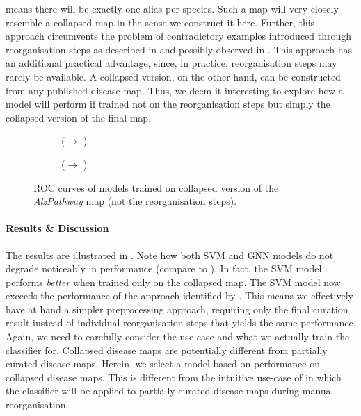 \documentclass[
	fontsize=10pt, %
	twoside=true, %
	secnumdepth=1, %
  toc=indentunnumbered %
]{kaobook}
\begin{document}
means there will be exactly one alias per species. Such a map will very closely
resemble a collapsed map in the sense we construct it here.
%
%
Further, this approach circumvents the problem of contradictory examples introduced
through reorganisation steps as described in  and possibly
observed in .
%
This approach has an additional practical advantage, since, in practice,
reorganisation steps may rarely be available. A collapsed version, on the
other hand, can be constructed from any published disease map.
%
Thus, we deem it interesting to explore how a model will perform if trained not
on the reorganisation steps but simply the collapsed version of the final map.
%

\begin{figure}[h]
  \centering
  \begin{subfigure}[h]{0.48\linewidth}
    \caption{(\ADLast $\rightarrow$ \PDMap)}
  \end{subfigure}
  \begin{subfigure}[h]{0.48\linewidth}
    \caption{(\ADLast $\rightarrow$ \ReconMap{})}
  \end{subfigure}
  \caption{ROC curves of models trained on collapsed version of the
    \textit{AlzPathway} map (not the reorganisation steps).}
  \label{fig:importance-reorganisation-steps}
\end{figure}

\paragraph{Results \& Discussion} The results are illustrated in
. Note how both SVM and GNN models do
not degrade noticeably in performance (compare to ).
In fact, the SVM model performs \textit{better} when trained only on the
collapsed map. The SVM model now exceeds the performance of the
approach identified by \nielsen{}. This means we effectively have at hand a
simpler preprocessing approach, requiring only the final curation result instead
of individual reorganisation steps that yields the same performance. Again, we
need to carefully consider the use-case and what we actually train the
classifier for. Collapsed disease maps are potentially different from partially
curated disease maps. Herein, we select a model based on performance on
collapsed disease maps. This is different from the intuitive use-case of
\nielsen{} in which the classifier will be applied to partially curated disease
maps during manual reorganisation.
\end{document}
